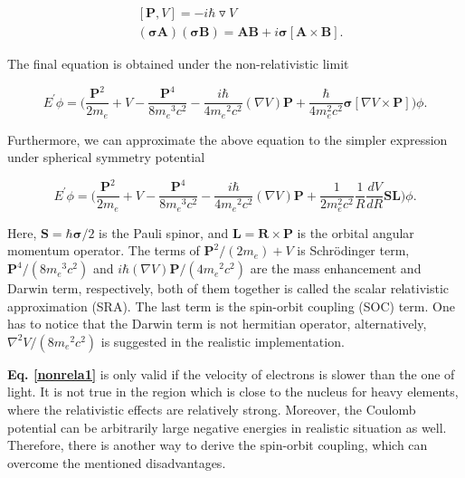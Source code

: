 \documentclass[a4paper, 12pt, titlepage,oneside,drop]{kthesis}
\begin{document}
\begin{equation}
\begin{split}
& [\textbf{P}, V ] = -i \hbar \triangledown V \\                
&(\boldsymbol{\sigma} \textbf{A} )(\boldsymbol{\sigma} \textbf{B}) = \textbf{A} \textbf{B} + i\boldsymbol{\sigma}[\textbf{A} \times \textbf{B}].
\end{split}
\end{equation}

The final equation is obtained under the non-relativistic limit

\begin{equation}\label{nonrela1}
E^{\prime} \phi = \Big(\frac{\textbf{P}^2}{2m_e} + V - \frac{\textbf{P}^4}{8 {m_e}^3 {c}^2}-\frac{i\hbar}{4{m_e}^2 {c}^2} (\nabla{V})\textbf{P}+\frac{\hbar}{4 m_e^2 c^2} \boldsymbol{\sigma}[\nabla{V} \times \textbf{P}]\Big) \phi.
\end{equation}

Furthermore, we can approximate the above equation to the simpler expression under spherical symmetry potential

\begin{equation}\label{socequ}
 E^{\prime} \phi = \Big(\frac{\textbf{P}^2}{2m_e} +V - \frac{\textbf{P}^4}{8 {m_e}^3 {c}^2}-\frac{i\hbar}{4{m_e}^2 {c}^2} (\nabla{V})\textbf{P}+\frac{1}{2 m_e^2 c^2} \frac{1}{R} \frac{dV}{dR}\textbf{S}\textbf{L}\Big) \phi.
\end{equation}

\noindent Here, $\textbf{S} = {\hbar}{\boldsymbol{\sigma}}/2$ is the Pauli spinor, and $\textbf{L} = \textbf{R} \times \textbf{P}$ is the orbital
angular momentum operator. The terms of ${\textbf{P}^2}/(2m_e) + V$ is Schrödinger term,  ${\textbf{P}^4}/(8 {m_e}^3 {c}^2)$ and ${i\hbar} (\nabla{V})\textbf{P} /(4{m_e}^2 {c}^2)$  are the mass enhancement 
and Darwin term, respectively, both of them together is called the scalar relativistic approximation (SRA). The last term is the spin-orbit coupling (SOC) term. One has to
notice that the Darwin term is not hermitian operator, alternatively, $\nabla^2{V} /(8{m_e}^2 {c}^2)$ is suggested in the realistic implementation.

\textbf{Eq. \ref{nonrela1}} is only valid if the velocity of electrons is slower than the one of light. It is not true in the region which is close to the nucleus for heavy elements, where the relativistic effects
are relatively strong. Moreover, the Coulomb potential can be arbitrarily large negative energies in realistic situation as well. Therefore, there is another way to derive 
the spin-orbit coupling, which can overcome the mentioned disadvantages.
\end{document}
